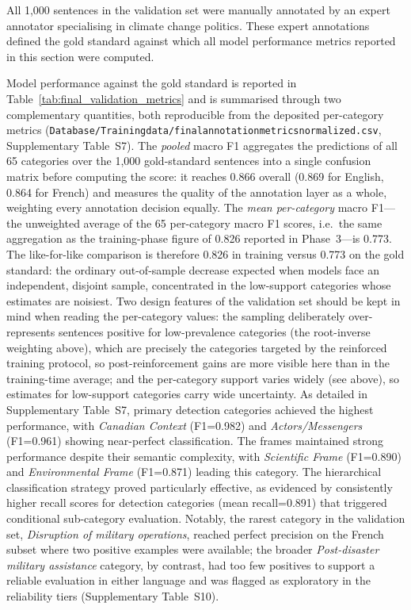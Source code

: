 \documentclass[12pt]{article}
\renewcommand\_{\texttt{\detokenize{_}\allowbreak}}
\begin{document}
All 1,000 sentences in the validation set were manually annotated by an expert annotator specialising in climate change politics. These expert annotations defined the gold standard against which all model performance metrics reported in this section were computed.

Model performance against the gold standard is reported in Table~\ref{tab:final_validation_metrics} and is summarised through two complementary quantities, both reproducible from the deposited per-category metrics (\texttt{Database/Training\_data/final\_annotation\_metrics\_normalized.csv}, Supplementary Table~S7). The \emph{pooled} macro F1 aggregates the predictions of all 65 categories over the 1{,}000 gold-standard sentences into a single confusion matrix before computing the score: it reaches 0.866 overall (0.869 for English, 0.864 for French) and measures the quality of the annotation layer as a whole, weighting every annotation decision equally. The \emph{mean per-category} macro F1---the unweighted average of the 65 per-category macro F1 scores, i.e.\ the same aggregation as the training-phase figure of 0.826 reported in Phase~3---is 0.773. The like-for-like comparison is therefore 0.826 in training versus 0.773 on the gold standard: the ordinary out-of-sample decrease expected when models face an independent, disjoint sample, concentrated in the low-support categories whose estimates are noisiest. Two design features of the validation set should be kept in mind when reading the per-category values: the sampling deliberately over-represents sentences positive for low-prevalence categories (the root-inverse weighting above), which are precisely the categories targeted by the reinforced training protocol, so post-reinforcement gains are more visible here than in the training-time average; and the per-category support varies widely (see above), so estimates for low-support categories carry wide uncertainty. As detailed in Supplementary Table~S7, primary detection categories achieved the highest performance, with \textit{Canadian Context} (F1=0.982) and \textit{Actors/Messengers} (F1=0.961) showing near-perfect classification. The frames maintained strong performance despite their semantic complexity, with \textit{Scientific Frame} (F1=0.890) and \textit{Environmental Frame} (F1=0.871) leading this category. The hierarchical classification strategy proved particularly effective, as evidenced by consistently higher recall scores for detection categories (mean recall=0.891) that triggered conditional sub-category evaluation. Notably, the rarest category in the validation set, \textit{Disruption of military operations}, reached perfect precision on the French subset where two positive examples were available; the broader \textit{Post-disaster military assistance} category, by contrast, had too few positives to support a reliable evaluation in either language and was flagged as exploratory in the reliability tiers (Supplementary Table~S10).
\end{document}
